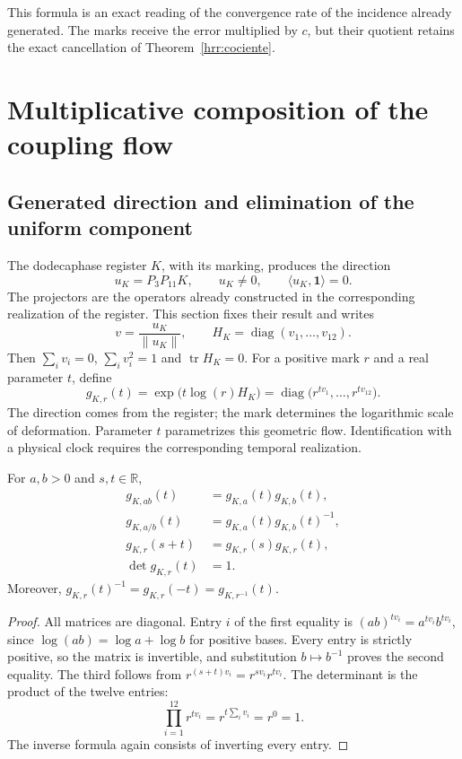 This formula is an exact reading of the convergence rate of the incidence already generated. The marks receive the error multiplied by \(c\), but their quotient retains the exact cancellation of Theorem~\ref{hrr:cociente}.

\section{Multiplicative composition of the coupling flow}
\label{hrr:flujo}

\subsection{Generated direction and elimination of the uniform component}

The dodecaphase register \(K\), with its marking, produces the direction
\[
 u_K=P_3P_{11}K,\qquad u_K\neq0,\qquad
 \langle u_K,\mathbf1\rangle=0.
\]
The projectors are the operators already constructed in the corresponding realization of the register. This section fixes their result and writes
\[
 v=\frac{u_K}{\|u_K\|},\qquad
 H_K=\operatorname{diag}(v_1,\ldots,v_{12}).
\]
Then \(\sum_i v_i=0\), \(\sum_i v_i^2=1\) and \(\operatorname{tr}H_K=0\). For a positive mark \(r\) and a real parameter \(t\), define
\begin{equation}
 g_{K,r}(t)=\exp\bigl(t\log(r)H_K\bigr)
 =\operatorname{diag}\bigl(r^{tv_1},\ldots,r^{tv_{12}}\bigr).
 \label{hrr:g-definicion}
\end{equation}
The direction comes from the register; the mark determines the logarithmic scale of deformation. Parameter \(t\) parametrizes this geometric flow. Identification with a physical clock requires the corresponding temporal realization.

\begin{theorem}
\label{hrr:homomorfismo}
For \(a,b>0\) and \(s,t\in\mathbb R\),
\begin{align}
 g_{K,ab}(t)&=g_{K,a}(t)g_{K,b}(t),
 \label{hrr:producto}\\
 g_{K,a/b}(t)&=g_{K,a}(t)g_{K,b}(t)^{-1},
 \label{hrr:cociente-flujo}\\
 g_{K,r}(s+t)&=g_{K,r}(s)g_{K,r}(t),
 \label{hrr:grupo-t}\\
 \det g_{K,r}(t)&=1.
 \label{hrr:determinante}
\end{align}
Moreover, \(g_{K,r}(t)^{-1}=g_{K,r}(-t)=g_{K,r^{-1}}(t)\).
\end{theorem}
\begin{proof}
All matrices are diagonal. Entry \(i\) of the first equality is \((ab)^{tv_i}=a^{tv_i}b^{tv_i}\), since \(\log(ab)=\log a+\log b\) for positive bases. Every entry is strictly positive, so the matrix is invertible, and substitution \(b\mapsto b^{-1}\) proves the second equality. The third follows from \(r^{(s+t)v_i}=r^{sv_i}r^{tv_i}\). The determinant is the product of the twelve entries:
\[
 \prod_{i=1}^{12}r^{tv_i}
 =r^{t\sum_i v_i}=r^0=1.
\]
The inverse formula again consists of inverting every entry.
\end{proof}

